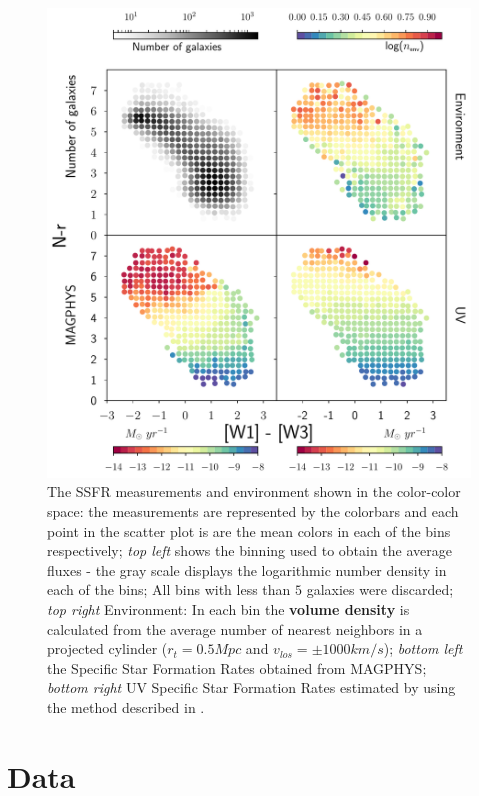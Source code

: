 \documentclass[iop]{emulateapj}
\begin{document}
\begin{figure}
    \centering
	\includegraphics[width = 16 cm, height = 16 cm]{panel_plot.pdf}
	\caption{The SSFR measurements and environment shown in the color-color space: the measurements are represented by the colorbars and each point in the scatter plot is are the mean colors in each of the bins respectively; \emph{top left} shows the binning used to obtain the average fluxes - the gray scale displays the logarithmic number density in each of the bins; All bins with less than $5$ galaxies were discarded; \emph{top right} Environment:  In each bin the \textbf{volume density} is calculated from the average number of nearest neighbors in a projected cylinder ($r_{t} = 0.5 Mpc$ and $v_{los} = \pm 1000 km/s$); \emph{bottom left} the Specific Star Formation Rates obtained from MAGPHYS; \emph{bottom right} UV Specific Star Formation Rates estimated by using the method described in \citet{Sal07}.} 
\end{figure}


\section{Data}
\end{document}
